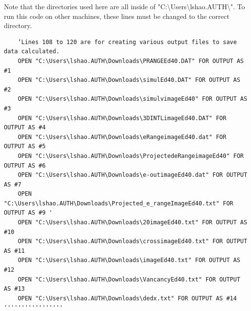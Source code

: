 \documentclass[10pt, reqno]{exam}
\begin{document}
{Note that the directories used here are all inside of "C:\textbackslash Users\textbackslash lshao.AUTH\textbackslash ". To run this code on other machines, these lines must be changed to the correct directory. \par

\begin{verbatim}
    ‘Lines 108 to 120 are for creating various output files to save data calculated. 
    OPEN "C:\Users\lshao.AUTH\Downloads\PRANGEEd40.DAT" FOR OUTPUT AS #1
    OPEN "C:\Users\lshao.AUTH\Downloads\simulEd40.DAT" FOR OUTPUT AS #2
    OPEN "C:\Users\lshao.AUTH\Downloads\simulvimageEd40" FOR OUTPUT AS #3
    OPEN "C:\Users\lshao.AUTH\Downloads\3DINTLimageEd40.DAT" FOR OUTPUT AS #4
    OPEN "C:\Users\lshao.AUTH\Downloads\eRangeimageEd40.dat" FOR OUTPUT AS #5
    OPEN "C:\Users\lshao.AUTH\Downloads\ProjectedeRangeimageEd40" FOR OUTPUT AS #6
    OPEN "C:\Users\lshao.AUTH\Downloads\e-outimageEd40.dat" FOR OUTPUT AS #7
    OPEN "C:\Users\lshao.AUTH\Downloads\Projected_e_rangeImageEd40.txt" FOR OUTPUT AS #9 '
    OPEN "C:\Users\lshao.AUTH\Downloads\20imageEd40.txt" FOR OUTPUT AS #10
    OPEN "C:\Users\lshao.AUTH\Downloads\crossimageEd40.txt" FOR OUTPUT AS #11
    OPEN "C:\Users\lshao.AUTH\Downloads\imageEd40.txt" FOR OUTPUT AS #12
    OPEN "C:\Users\lshao.AUTH\Downloads\VancancyEd40.txt" FOR OUTPUT AS #13
    OPEN "C:\Users\lshao.AUTH\Downloads\dedx.txt" FOR OUTPUT AS #14 '''''''''''''''''
\end{verbatim}
}
\end{document}
